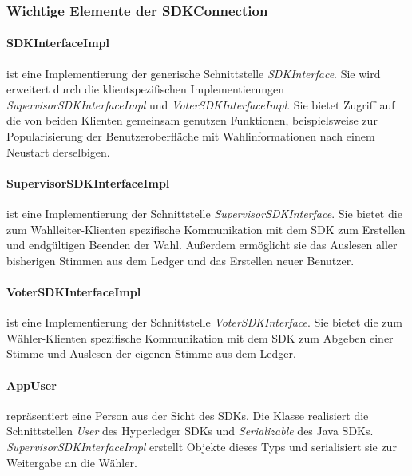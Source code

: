 \documentclass[parskip=full]{scrartcl}
\newcommand{\textitx}[1]{\mbox{\textit{#1}}}
\begin{document}
	\subsubsection{Wichtige Elemente der SDKConnection}
	\paragraph{SDKInterfaceImpl} ist eine Implementierung der generische Schnittstelle \textitx{SDKInterface}. Sie wird erweitert durch die klientspezifischen Implementierungen \textit{SupervisorSDKInterfaceImpl} und \textit{VoterSDKInterfaceImpl}. Sie bietet Zugriff auf die von beiden Klienten gemeinsam genutzen Funktionen, beispielsweise zur Popularisierung der Benutzeroberfläche mit Wahlinformationen nach einem Neustart derselbigen.
	\paragraph{SupervisorSDKInterfaceImpl} ist eine Implementierung der Schnittstelle \textit{SupervisorSDKInterface}. Sie bietet die zum Wahlleiter-Klienten spezifische Kommunikation mit dem SDK zum Erstellen und endgültigen Beenden der Wahl. Außerdem ermöglicht sie das Auslesen aller bisherigen Stimmen aus dem Ledger und das Erstellen neuer Benutzer.
	\paragraph{VoterSDKInterfaceImpl} ist eine Implementierung der Schnittstelle \textit{VoterSDKInterface}. Sie bietet die zum Wähler-Klienten spezifische Kommunikation mit dem SDK zum Abgeben einer Stimme und Auslesen der eigenen Stimme aus dem Ledger.
	\paragraph{AppUser} repräsentiert eine Person aus der Sicht des SDKs. Die Klasse realisiert die Schnittstellen \textitx{User} des Hyperledger SDKs und \textitx{Serializable} des Java SDKs. \textit{SupervisorSDKInterfaceImpl} erstellt Objekte dieses Typs und serialisiert sie zur Weitergabe an die Wähler.
\end{document}
